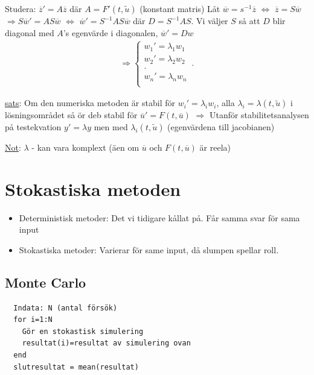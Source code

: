 \documentclass{article}
\begin{document}
Studera: $\overline{z}'=A\overline{z}$ där $A=F'(t,\tilde{u})$ (konstant matris)
Låt $\overline{w}=s^{-1}\overline{z}$ $\Leftrightarrow$ $\overline{z}=S\overline{w}$
$\Rightarrow S\overline{w}'= AS\overline{w}$ $\Leftrightarrow$ $\overline{w}'=S^{-1}AS\overline{w}$
där $D=S^{-1}AS$. Vi väljer $S$ så att $D$ blir diagonal med $A$'s egenvärde i diagonalen,
$\overline{w}'=Dw$
\begin{align*}
\Rightarrow 
\begin{cases}
  w_1'=\lambda_1w_1\\
  w_2'=\lambda_2w_2\\
  .\\
  w_n'=\lambda_nw_n\\
\end{cases}\,.
\end{align*}

\underline{sats}: Om den numeriska metoden är stabil för $w_i'=\lambda_iw_i$, alla $\lambda_i=\lambda(t,\tilde{u})$
i lösningsområdet så ör deb stabil för $\overline{u}'=F(t,\overline{u})$
$\Rightarrow$ Utanför stabilitetsanalysen på testekvation $y'=\lambda y$ men med $\lambda_i(t,\tilde{u})$
(egenvärdena till jacobianen)

\underline{Not}: $\lambda$ - kan vara komplext (äen om $\overline{u}$ och $F(t,\overline{u})$ är reela)


\newpage
\section{Stokastiska metoden}
\begin{itemize}
  \item Deterministisk metoder: Det vi tidigare kållat på. Får samma svar för sama input
  \item Stokastiska metoder: Varierar för same input, då slumpen spellar roll.
\end{itemize}

\subsection{Monte Carlo}
\begin{verbatim}
  Indata: N (antal försök)
  for i=1:N
    Gör en stokastisk simulering
    resultat(i)=resultat av simulering ovan
  end 
  slutresultat = mean(resultat)
\end{verbatim}
\end{document}
